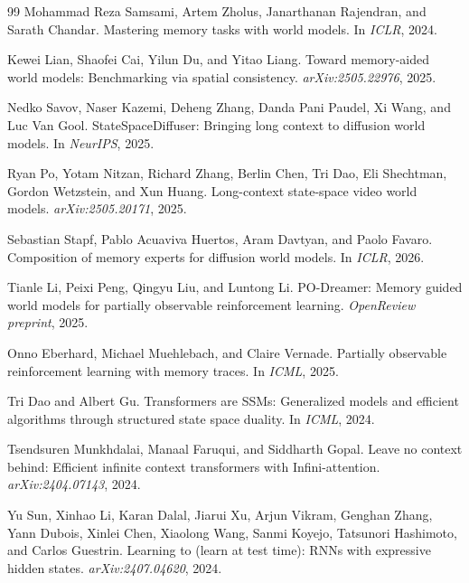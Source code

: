 \begin{thebibliography}{99}
Mohammad Reza Samsami, Artem Zholus, Janarthanan Rajendran, and Sarath
Chandar.
\newblock Mastering memory tasks with world models.
\newblock In \emph{ICLR}, 2024.

Kewei Lian, Shaofei Cai, Yilun Du, and Yitao Liang.
\newblock Toward memory-aided world models: Benchmarking via spatial
consistency.
\newblock \emph{arXiv:2505.22976}, 2025.

Nedko Savov, Naser Kazemi, Deheng Zhang, Danda Pani Paudel, Xi Wang, and Luc
Van Gool.
\newblock StateSpaceDiffuser: Bringing long context to diffusion world models.
\newblock In \emph{NeurIPS}, 2025.

Ryan Po, Yotam Nitzan, Richard Zhang, Berlin Chen, Tri Dao, Eli Shechtman,
Gordon Wetzstein, and Xun Huang.
\newblock Long-context state-space video world models.
\newblock \emph{arXiv:2505.20171}, 2025.

Sebastian Stapf, Pablo Acuaviva Huertos, Aram Davtyan, and Paolo Favaro.
\newblock Composition of memory experts for diffusion world models.
\newblock In \emph{ICLR}, 2026.

Tianle Li, Peixi Peng, Qingyu Liu, and Luntong Li.
\newblock PO-Dreamer: Memory guided world models for partially observable
reinforcement learning.
\newblock \emph{OpenReview preprint}, 2025.

Onno Eberhard, Michael Muehlebach, and Claire Vernade.
\newblock Partially observable reinforcement learning with memory traces.
\newblock In \emph{ICML}, 2025.

Tri Dao and Albert Gu.
\newblock Transformers are SSMs: Generalized models and efficient algorithms
through structured state space duality.
\newblock In \emph{ICML}, 2024.

Tsendsuren Munkhdalai, Manaal Faruqui, and Siddharth Gopal.
\newblock Leave no context behind: Efficient infinite context transformers
with Infini-attention.
\newblock \emph{arXiv:2404.07143}, 2024.

Yu Sun, Xinhao Li, Karan Dalal, Jiarui Xu, Arjun Vikram, Genghan Zhang, Yann
Dubois, Xinlei Chen, Xiaolong Wang, Sanmi Koyejo, Tatsunori Hashimoto, and
Carlos Guestrin.
\newblock Learning to (learn at test time): RNNs with expressive hidden
states.
\newblock \emph{arXiv:2407.04620}, 2024.


\end{thebibliography}

